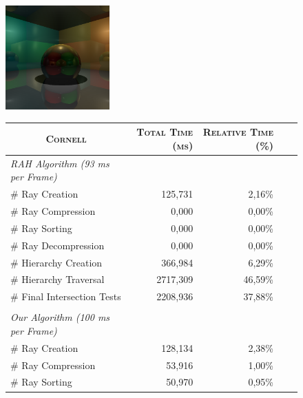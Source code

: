 \begin{figure}[!htb]
    \begin{minipage}{0.25\linewidth}
        \centering
        \includegraphics[width=4.0cm]{Images/Cornell_Preview}
    \end{minipage}
    \begin{minipage}{0.725\linewidth}
        \centering
        \fontsize{8}{10}
        \selectfont
        \begin{tabular}[h]{l|rrrr}
            \multicolumn{1}{c|}{\textsc{Cornell}} & \textsc{Total Time (ms)} & \textsc{Relative Time (\%)}\\
            \hline
            \emph{RAH Algorithm (93 ms per Frame)} & & \\
            \hline
            \quad \# Ray Creation               & 125,731	& 2,16\%	\\
            \quad \# Ray Compression            & 0,000     & 0,00\%	\\
            \quad \# Ray Sorting                & 0,000	    & 0,00\%    \\
            \quad \# Ray Decompression          & 0,000	    & 0,00\%    \\
            \quad \# Hierarchy Creation         & 366,984	& 6,29\%    \\
            \quad \# Hierarchy Traversal        & 2717,309	& 46,59\%   \\
            \quad \# Final Intersection Tests   & 2208,936	& 37,88\%	\\
            & & \\
            \hline
            \emph{Our Algorithm (100 ms per Frame)} & & \\
            \hline
            \quad \# Ray Creation               & 128,134	& 2,38\%	\\
            \quad \# Ray Compression            & 53,916    & 1,00\%	\\
            \quad \# Ray Sorting                & 50,970    & 0,95\%    \\

\end{tabular}
\end{minipage}
\end{figure}
